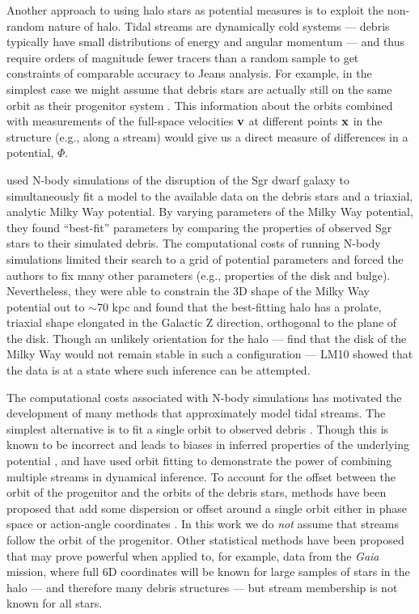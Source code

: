 \documentclass[letterpaper,12pt,preprint]{aastex}
\newcommand{\project}[1]{\textsl{#1}}
\newcommand{\gaia}{\project{Gaia}}
\begin{document}
Another approach to using halo stars as potential measures is to exploit the non-random nature of halo. Tidal streams are dynamically cold systems --- debris typically have small distributions of energy and angular momentum --- and thus require orders of magnitude fewer tracers than a random sample to get constraints of comparable accuracy to Jeans analysis. For example, in the simplest case we might assume that debris stars are actually still on the same orbit as their progenitor system \citep[a \emph{wrong} assumption, see e.g.,][]{eyre11}. This information about the orbits combined with measurements of the full-space velocities ${\bf v}$ at different points ${\bf x}$ in the structure (e.g., along a stream) would give us a direct measure of differences in a potential, $\Phi$.

\citet[][LM10]{law10} used N-body simulations of the disruption of the Sgr dwarf galaxy to simultaneously fit a model to the available data on the debris stars and a triaxial, analytic Milky Way potential. By varying parameters of the Milky Way potential, they found ``best-fit'' parameters by comparing the properties of observed Sgr stars to their simulated debris. The computational costs of running N-body simulations limited their search to a grid of potential parameters and forced the authors to fix many other parameters (e.g., properties of the disk and bulge). Nevertheless, they were able to constrain the 3D shape of the Milky Way potential out to $\sim$70 kpc and found that the best-fitting halo has a prolate, triaxial shape elongated in the Galactic Z direction, orthogonal to the plane of the disk. Though an unlikely orientation for the halo --- \cite{debattista13} find that the disk of the Milky Way would not remain stable in such a configuration --- LM10 showed that the data is at a state where such inference can be attempted. 

The computational costs associated with N-body simulations has motivated the development of many methods that approximately model tidal streams. The simplest alternative is to fit a single orbit to observed debris \citep[e.g.,][]{koposov10, deg13}. Though this is known to be incorrect and leads to biases in inferred properties of the underlying potential \citep[e.g.,][]{eyre11, lux13, sanders13a}, \cite{deg14} and \cite{lux13} have used orbit fitting to demonstrate the power of combining multiple streams in dynamical inference. To account for the offset between the orbit of the progenitor and the orbits of the debris stars, methods have been proposed that add some dispersion or offset around a single orbit either in phase space \citep[e.g.,][]{eyre09a, varghese11, kuepper12} or action-angle coordinates \citep{eyre11, sanders13b, bovy14, sanders14}. In this work we do \emph{not} assume that streams follow the orbit of the progenitor. Other statistical methods have been proposed \citep[][]{penarrubia12, johnston99a} that may prove powerful when applied to, for example, data from the \gaia\, mission, where full 6D coordinates will be known for large samples of stars in the halo --- and therefore many debris structures --- but stream membership is not known for all stars. %
\end{document}
